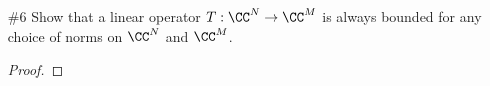\documentclass[11pt, oneside]{article}
\begin{document}
\begin{enumerate}
\begin{proof}
      Lastly I will show that $\norm{S} = \norm{T}$.
      Consider the following.
      \begin{align*}
        \norm{S} &= \sup*[x \in \overline{D(T)}]{\frac{\norm[Y]{Sx}}{\norm[X]{x}} \\
      \end{align*}
    \end{proof}

  \pagebreak
  \item[\#6]
    Show that a linear operator $T:\CC^N \to \CC^M$ is always bounded for
    any choice of norms on $\CC^N$ and $\CC^M$.

    \begin{proof}
      
    \end{proof}
\end{enumerate}
\end{document}
